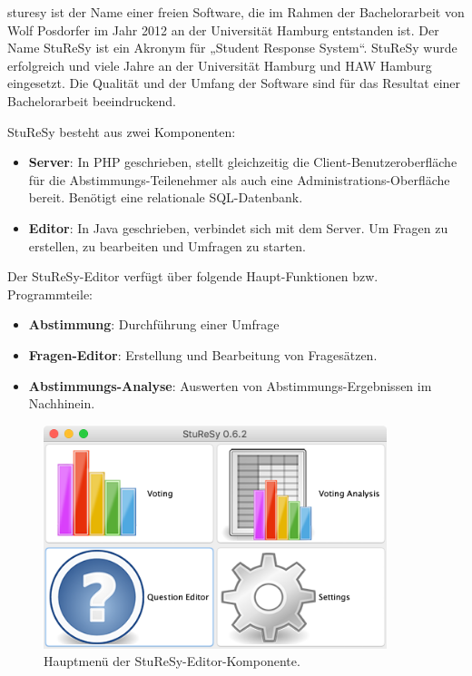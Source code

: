 \ac{sturesy} ist der Name einer freien Software, die im Rahmen der Bachelorarbeit von Wolf Posdorfer im Jahr 2012 an der Universität Hamburg entstanden ist\cite{sturesy}. Der Name StuReSy ist ein Akronym für „Student Response System“. StuReSy wurde erfolgreich und viele Jahre an der Universität Hamburg und HAW Hamburg eingesetzt. Die Qualität und der Umfang der Software sind für das Resultat einer Bachelorarbeit beeindruckend.

StuReSy besteht aus zwei Komponenten:
\begin{itemize}
    \item \textbf{Server}: In PHP geschrieben, stellt gleichzeitig die Client-Benutzeroberfläche für die Abstimmungs-Teilenehmer als auch eine Administrations-Oberfläche bereit. Benötigt eine relationale SQL-Datenbank.
    \item \textbf{Editor}: In Java geschrieben, verbindet sich mit dem Server. Um Fragen zu erstellen, zu bearbeiten und Umfragen zu starten.
\end{itemize}

Der StuReSy-Editor verfügt über folgende Haupt-Funktionen bzw. Programmteile:
\begin{itemize}
    \item \textbf{Abstimmung}: Durchführung einer Umfrage
    \item \textbf{Fragen-Editor}: Erstellung und Bearbeitung von Fragesätzen.
    \item \textbf{Abstimmungs-Analyse}: Auswerten von Abstimmungs-Ergebnissen im Nachhinein.
\end{itemize}

\begin{figure}[H]
    \includegraphics[width=10cm]{chapter/bewertung/bilder/StuReSy_Hauptmenue.png}
    \centering
    \caption{Hauptmenü der StuReSy-Editor-Komponente.}
    \label{Abbildung 2.1}
\end{figure}


